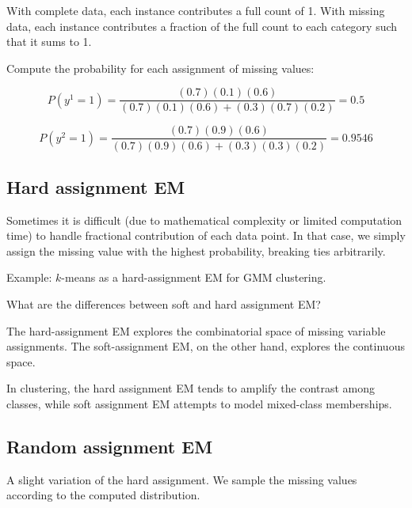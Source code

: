 \documentclass{discussion}
\begin{document}
With complete data, each instance contributes a full count of 1. With missing data, each instance contributes a fraction of the full count to each category such that it sums to 1.

Compute the probability for each assignment of missing values:

\[P(y^1 = 1) = \frac{(0.7)(0.1)(0.6)}{(0.7)(0.1)(0.6) + (0.3)(0.7)(0.2)} = 0.5 \]

\[P(y^2 = 1) = \frac{(0.7)(0.9)(0.6)}{(0.7)(0.9)(0.6) + (0.3)(0.3)(0.2)} = 0.9546 \]

\subsection{Hard assignment EM}
Sometimes it is difficult (due to mathematical complexity or limited computation time) to handle fractional contribution of each data point. In that case, we simply assign the missing value with the highest probability, breaking ties arbitrarily.

Example: $k$-means as a hard-assignment EM for GMM clustering.

\begin{exercise}
What are the differences between soft and hard assignment EM?
\end{exercise}
	The hard-assignment EM explores the combinatorial space of missing variable assignments. The soft-assignment EM, on the other hand, explores the continuous space.

	In clustering, the hard assignment EM tends to amplify the contrast among classes, while soft assignment EM attempts to model mixed-class memberships.

\subsection{Random assignment EM}

A slight variation of the hard assignment. We sample the missing values according to the computed distribution.
\end{document}
